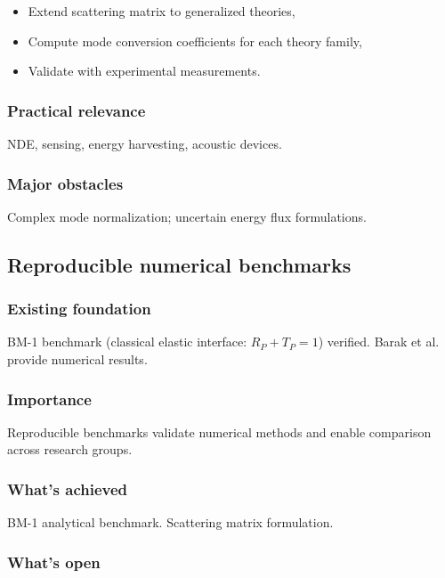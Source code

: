 \begin{itemize}
\item Extend scattering matrix to generalized theories,
\item Compute mode conversion coefficients for each theory family,
\item Validate with experimental measurements.
\end{itemize}

\subsubsection{Practical relevance}

NDE, sensing, energy harvesting, acoustic devices.

\subsubsection{Major obstacles}

Complex mode normalization; uncertain energy flux formulations.

\subsection{Reproducible numerical benchmarks}
\label{sec:16.7}

\subsubsection{Existing foundation}

BM-1 benchmark (classical elastic interface: $R_P + T_P = 1$) verified. Barak et al.~\cite{Barak2023} provide numerical results.

\subsubsection{Importance}

Reproducible benchmarks validate numerical methods and enable comparison across research groups.

\subsubsection{What's achieved}

BM-1 analytical benchmark. Scattering matrix formulation.

\subsubsection{What's open}

